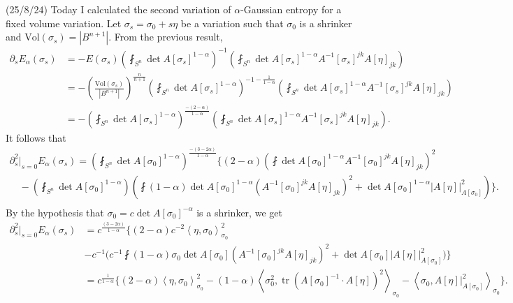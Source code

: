 \documentclass[12pt,a4paper]{article}
\begin{document}
(25/8/24) Today I calculated the second variation of $ \alpha $-Gaussian entropy for a fixed volume variation. Let $ \sigma_{s} = \sigma_{0}+s \eta $ be a variation such that $ \sigma_{0} $ is a shrinker and $ \text{Vol}(\sigma_{s}) = |B^{n+1}| $. From the previous result, \begin{align*}
   \partial_{s} E_{\alpha}(\sigma_{s}) & = - E(\sigma_{s})\left( \fint_{S^{n}} \det A[\sigma_{s}]^{1-\alpha} \right)^{-1} \left(\fint_{S^{n}} \det A[\sigma_{s}]^{1-\alpha}A^{-1}[\sigma_{s}]^{jk}A[\eta]_{jk} \right) \\
   & = - \left( \frac{\text{Vol}(\sigma_{s})}{|B^{n+1}|} \right)^{ \frac{n}{n+1}} \left( \fint_{S^{n}} \det A[\sigma_{s}]^{1-\alpha} \right)^{-1 - \frac{1}{1-\alpha}} \left(\fint_{S^{n}} \det A[\sigma_{s}]^{1-\alpha}A^{-1}[\sigma_{s}]^{jk}A[\eta]_{jk} \right) \\
   & = - \left( \fint_{S^{n}} \det A[\sigma_{s}]^{1-\alpha} \right)^{\frac{-(2-\alpha)}{1-\alpha}} \left(\fint_{S^{n}} \det A[\sigma_{s}]^{1-\alpha}A^{-1}[\sigma_{s}]^{jk}A[\eta]_{jk} \right).
\end{align*} 
It follows that \begin{align*}
   \partial^{2}_{s}\big|_{s=0} E_{\alpha}(\sigma_{s})  = \left( \fint_{S^{n}} \det A[\sigma_{0}]^{1-\alpha} \right)^{\frac{-(3-2\alpha)}{1-\alpha}}\Biggl\{ (2-\alpha)\left( \fint \det A[\sigma_{0}]^{1-\alpha}A^{-1}[\sigma_{0}]^{jk}A[\eta]_{jk}  \right)^{2}  \\
   \quad - \left( \fint_{S^{n}} \det A[\sigma_{0}]^{1-\alpha} \right) \left( \fint (1-\alpha)\det A[\sigma_{0}]^{1-\alpha} (A^{-1}[\sigma_{0}]^{jk}A[\eta]_{jk})^{2} + \det A[\sigma_{0}]^{1-\alpha}|A[\eta]|_{A[\sigma_{0}]}^{2} \right) \Biggr\}. \\
\end{align*}
By the hypothesis that $ \sigma_{0} = c \det A[\sigma_{0}]^{-\alpha} $ is a shrinker, we get
\begin{align*}
   \partial^{2}_{s}\big|_{s=0} E_{\alpha}(\sigma_{s})  & = c^{\frac{(3-2\alpha)}{1-\alpha}} \biggl\{ (2-\alpha)c^{-2} \left< \eta, \sigma_{0} \right>_{\sigma_{0}}^{2} \\
   & - c^{-1} \biggl(c^{-1}\fint (1- \alpha) \sigma_{0}\det A[\sigma_{0}] (A^{-1}[\sigma_{0}]^{jk}A[\eta]_{jk})^{2} + \det A[\sigma_{0}]|A[\eta]|_{A[\sigma_{0}]}^{2} \biggr) \biggr\} \\
   & = c^{\frac{1}{1-\alpha}} \biggl\{ (2-\alpha) \left< \eta, \sigma_{0} \right>_{\sigma_{0}}^{2}  - (1-\alpha) \left< \sigma_{0}^{2}, \operatorname{tr}(A[\sigma_{0}]^{-1} \cdot A[\eta])^{2} \right>_{\sigma_{0}} - \left< \sigma_{0}, A[\eta]|_{A[\sigma_{0}]}^{2} \right>_{\sigma_{0}} \biggr\} .
\end{align*}
\end{document}
